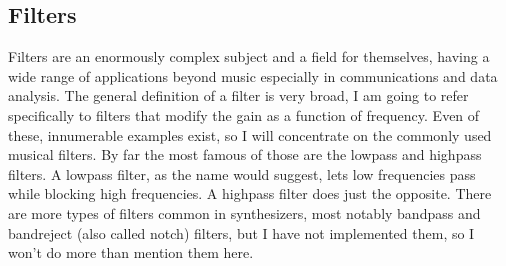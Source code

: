 \documentclass[11pt,a4paper]{article}
\begin{document}
\subsection{Filters}

Filters are an enormously complex subject and a field for themselves, having a wide range of applications beyond music especially in communications and data analysis. The general definition of a filter is very broad, I am going to refer specifically to filters that modify the gain as a function of frequency.
Even of these, innumerable examples exist, so I will concentrate on the commonly used musical filters. By far the most famous of those are the lowpass and highpass filters.
A lowpass filter, as the name would suggest, lets low frequencies pass while blocking high frequencies. A highpass filter does just the opposite.
There are more types of filters common in synthesizers, most notably bandpass and bandreject (also called notch) filters, but I have not implemented them, so I won't do more than mention them here.
\end{document}
